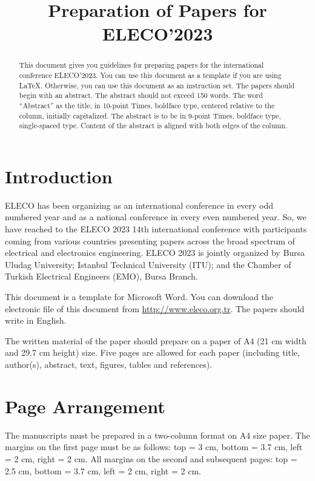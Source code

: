 \documentclass[9pt]{extarticle}
\title{Preparation of Papers for ELECO’2023}
\begin{document}

\maketitle

\begin{abstract}
This document gives you guidelines for preparing papers for the international conference ELECO’2023. You can use this document as a template if you are using \LaTeX. Otherwise, you can use this document as an instruction set. The papers should begin with an abstract. The abstract should not exceed 150 words. The word ``Abstract'' as the title, in 10-point Times, boldface type, centered relative to the column, initially capitalized. The abstract is to be in 9-point Times, boldface type, single-spaced type. Content of the abstract is aligned with both edges of the column.
\end{abstract}

\section{Introduction}

ELECO has been organizing as an international conference in every odd numbered year and as a national conference in every even numbered year. So, we have reached to the ELECO 2023 14th international conference with participants coming from various countries presenting papers across the broad spectrum of electrical and electronics engineering. ELECO 2023 is jointly organized by Bursa Uludag University; Istanbul Technical University (ITU); and the Chamber of Turkish Electrical Engineers (EMO), Bursa Branch.

This document is a template for Microsoft Word. You can download the electronic file of this document from \url{http://www.eleco.org.tr}. The papers should write in English.

The written material of the paper should prepare on a paper of A4 (21 cm width and 29.7 cm height) size. Five pages are allowed for each paper (including title, author(s), abstract, text, figures, tables and references).

\section{Page Arrangement}

The manuscripts must be prepared in a two-column format on A4 size paper. The margins on the first page must be as follows: top = 3 cm, bottom = 3.7 cm, left = 2 cm, right = 2 cm. All margins on the second and subsequent pages: top = 2.5 cm, bottom = 3.7 cm, left = 2 cm, right = 2 cm.
\end{document}
